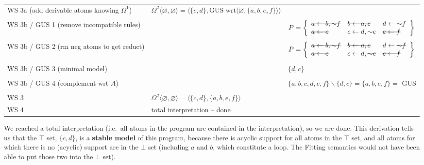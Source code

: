 \documentclass[9pt,a4paper,landscape]{article}
\newcommand{\msout}[1]{\text{\sout{$#1$}}}
\begin{document}
{\begin{center}
\begin{tabular}{p{5cm}p{7cm}p{7cm}}
		WS 3a (add derivable atoms knowing $\Omega^1$) 
		& $\Omega^2  \langle \varnothing, \varnothing \rangle = \langle \{c, d\}, \text{GUS wrt} \langle \varnothing, \{a, b, e, f\} \rangle \rangle$ &\\&\\
		WS 3b / GUS 1 (remove incompatible rules) 
		&
		& $P = \left\{\begin{array}{lll}
		\msout{a \leftarrow b, {\sim} f} & \msout{b \leftarrow a, c} & d \leftarrow {\sim} f\\
		\msout{a \leftarrow e} & c \leftarrow d, {\sim} e & \msout{e \leftarrow f}
		\end{array}\right\}$ \\ &\\
		WS 3b / GUS 2 (rm neg atoms to get reduct) 
		& 
		& $P = \left\{\begin{array}{lll}
		\msout{a \leftarrow b, {\sim} f} & \msout{b \leftarrow a, c} & d \leftarrow \msout{{\sim} f}\\
		\msout{a \leftarrow e} & c \leftarrow d, \msout{{\sim} e} & \msout{e \leftarrow f}
		\end{array}\right\}$ \\ &\\
		WS 3b / GUS 3 (minimal model) 
		& 
		& $\{ d, c \}$ \\ &\\
		WS 3b / GUS 4 (complement wrt $A$) 
		&
		&  $\{a, b, c, d, e, f\} \backslash \{d, c\} = \{a, b, e, f\} = $ GUS  \\&\\
		WS 3 
		& $\Omega^2  \langle \varnothing, \varnothing \rangle = \langle \{c, d\}, \{a, b, e, f\} \rangle$& \\ \midrule
		WS 4 & total interpretation -- done & \\ \midrule
	\end{tabular}
\end{center}

We reached a total interpretation (i.e.\ all atoms in the program are contained in the interpretation), so we are done.
This derivation tells us that the $\top$ set, $\{c, d\}$, is a \textbf{stable model} of this program, because there is acyclic support for all atoms in the $\top$ set, and all atoms for which there is no (acyclic) support are in the $\bot$ set (including $a$ and $b$, which constitute a loop. The Fitting semantics would not have been able to put those two into the $\bot$ set).

\pagebreak

}
\end{document}
